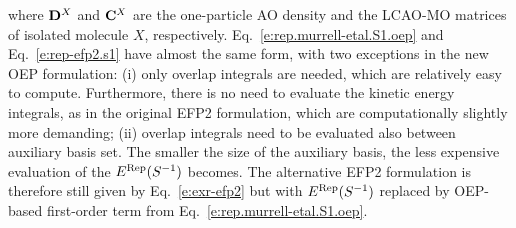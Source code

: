 %
where ${\bf D}^X$ and ${\bf C}^X$ are the one\hyp{}particle AO density and
the LCAO\hyp{}MO matrices of isolated molecule $X$, respectively.
%
Eq.~\eqref{e:rep.murrell-etal.S1.oep} and Eq.~\eqref{e:rep-efp2.s1} have almost
the same form, with two exceptions in the new OEP formulation: 
(i) only overlap integrals are needed, which are relatively easy to
compute. Furthermore, there is no need to evaluate the kinetic
energy integrals, as in the original EFP2
formulation, which are computationally slightly more demanding;
(ii) overlap integrals need to be evaluated also between
auxiliary basis set. The smaller the size of the auxiliary basis, the less expensive
evaluation of the $E^{\rm Rep}(S^{-1})$ becomes. 
The alternative EFP2 formulation %
is therefore still given by Eq.~\eqref{e:exr-efp2}
%
%
but with $E^{\rm Rep}(S^{-1})$ replaced by OEP\hyp{}based
first\hyp{}order term from Eq.~\eqref{e:rep.murrell-etal.S1.oep}.

